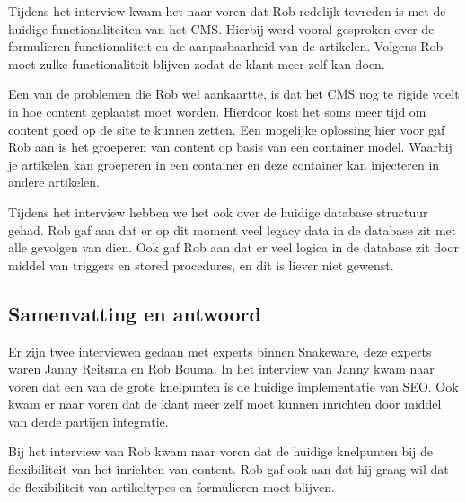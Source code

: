 \whitespace
Tijdens het interview kwam het naar voren dat Rob redelijk tevreden is met de huidige functionaliteiten van het CMS. 
Hierbij werd vooral gesproken over de formulieren functionaliteit en de aanpasbaarheid van de artikelen.
Volgens Rob moet zulke functionaliteit blijven zodat de klant meer zelf kan doen.

\whitespace
Een van de problemen die Rob wel aankaartte, is dat het CMS nog te rigide voelt in hoe content geplaatst moet worden.
Hierdoor kost het soms meer tijd om content goed op de site te kunnen zetten.
Een mogelijke oplossing hier voor gaf Rob aan is het groeperen van content op basis van een container model.
Waarbij je artikelen kan groeperen in een container en deze container kan injecteren in andere artikelen.

\whitespace
Tijdens het interview hebben we het ook over de huidige database structuur gehad.
Rob gaf aan dat er op dit moment veel legacy data in de database zit met alle gevolgen van dien.
Ook gaf Rob aan dat er veel logica in de database zit door middel van triggers en stored procedures, en dit is liever niet gewenst.

\subsection{Samenvatting en antwoord}
Er zijn twee interviewen gedaan met experts binnen Snakeware, deze experts waren Janny Reitsma en Rob Bouma.
In het interview van Janny kwam naar voren dat een van de grote knelpunten is de huidige implementatie van \gls{SEO}.
Ook kwam er naar voren dat de klant meer zelf moet kunnen inrichten door middel van derde partijen integratie.

\whitespace
Bij het interview van Rob kwam naar voren dat de huidige knelpunten bij de flexibiliteit van het inrichten van content.
Rob gaf ook aan dat hij graag wil dat de flexibiliteit van artikeltypes en formulieren moet blijven.
